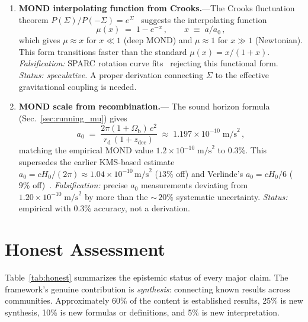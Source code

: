 \documentclass[prd,twocolumn,superscriptaddress,longbibliography,floatfix]{revtex4-2}
\begin{document}
\begin{enumerate}
\item \textbf{MOND interpolating function from
Crooks.}---The Crooks fluctuation theorem
$P(\Sigma)/P(-\Sigma) = e^{\Sigma}$~\cite{Crooks1999}
suggests the interpolating function
\begin{equation}
\mu(x) \;=\; 1 - e^{-x}\,,\qquad
x \;\equiv\; a/a_0\,,
\label{eq:mu_crooks}
\end{equation}
which gives $\mu \approx x$ for $x \ll 1$ (deep MOND)
and $\mu \approx 1$ for $x \gg 1$ (Newtonian).
This form transitions faster than the standard
$\mu(x) = x/(1+x)$.
\emph{Falsification:} SPARC rotation curve
fits~\cite{SPARC} rejecting this functional form.
\emph{Status: speculative.}  A proper derivation
connecting $\Sigma$ to the effective gravitational
coupling is needed.

\item \textbf{MOND scale from recombination.}---
The sound horizon formula (Sec.~\ref{sec:running_mu})
gives
\begin{equation}
a_0 \;=\; \frac{2\pi(1+\Omega_{\mathrm{b}})\,c^2}
{r_{\mathrm{d}}\,(1+z_{\mathrm{dec}})}
\;\approx\; 1.197 \times 10^{-10}\;\mathrm{m/s}^2\,,
\label{eq:a0_KMS}
\end{equation}
matching the empirical MOND value
$1.2 \times 10^{-10}\;\mathrm{m/s}^2$ to $0.3\%$.
This supersedes the earlier KMS-based estimate
$a_0 = cH_0/(2\pi) \approx 1.04 \times 10^{-10}\,
\mathrm{m/s}^2$ ($13\%$ off) and Verlinde's
$a_0 = cH_0/6$ ($9\%$ off)~\cite{Verlinde2016}.
\emph{Falsification:} precise $a_0$ measurements
deviating from $1.20 \times 10^{-10}\;\mathrm{m/s}^2$
by more than the ${\sim}\,20\%$ systematic uncertainty.
\emph{Status:} empirical with $0.3\%$ accuracy,
not a derivation.

\end{enumerate}


\section{Honest Assessment}
\label{sec:honest}

Table~\ref{tab:honest} summarizes the epistemic status of
every major claim.  The framework's genuine contribution is
\emph{synthesis}: connecting known results across communities.
Approximately 60\% of the content is established results,
25\% is new synthesis, 10\% is new formulas or definitions,
and 5\% is new interpretation.
\end{document}

